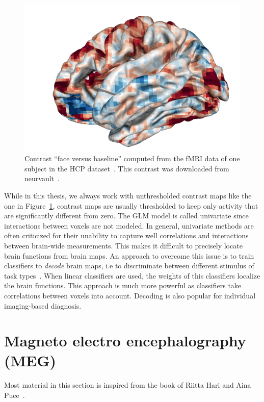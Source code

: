 \begin{figure}
  \includegraphics[scale=0.25]{figures/neuroscience/faces_vs_baseline.png}
  \caption{Contrast ``face versus baseline'' computed from the fMRI data of one
    subject in the HCP dataset~\cite{van2013wu}. This contrast was downloaded
    from neurvault~\cite{gorgolewski2015neurovault}.}
  \label{fig:hcp_contrast}
\end{figure}


While in this thesis, we always work with unthresholded contrast maps like the one in Figure~\ref{fig:hcp_contrast}, contrast maps
are usually thresholded to keep only activity that are significantly
different from zero.
The GLM model is called univariate since interactions between voxels are not
modeled.
In general, univariate methods are often criticized for their unability to
capture well correlations and interactions between brain-wide measurements.
This makes it difficult to precisely locate brain functions from brain maps. An approach to overcome this issue is to train classifiers to \emph{decode} brain maps, i.e to discriminate between different stimulus of task
types~\cite{shirer_decoding_2012,varoquaux_how_2014,loula_decoding_2018}. When linear classifiers are used, the weights of this classifiers localize the brain functions.
This approach is much more powerful as classifiers take correlations between
voxels into account. Decoding is also popular for individual imaging-based diagnosis.

\section{Magneto electro encephalography (MEG)}
Most material in this section is inspired from the book of Riitta Hari and Aina
Puce~\cite{hari2017meg}.

